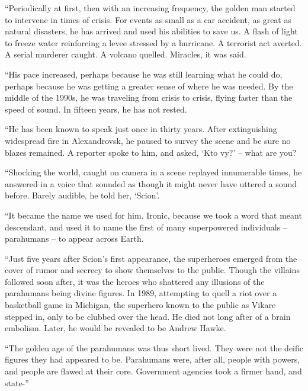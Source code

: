 ``Periodically at first, then with an increasing frequency, the golden man started to intervene in times of crisis.  For events as small as a car accident, as great as natural disasters, he has arrived and used his abilities to save us.  A flash of light to freeze water reinforcing a levee stressed by a hurricane.  A terrorist act averted.  A serial murderer caught.  A volcano quelled.  Miracles, it was said.



``His pace increased, perhaps because he was still learning what he could do, perhaps because he was getting a greater sense of where he was needed.  By the middle of the 1990s, he was traveling from crisis to crisis, flying faster than the speed of sound.  In fifteen years, he has not rested.



``He has been known to speak just once in thirty years.  After extinguishing widespread fire in Alexandrovsk, he paused to survey the scene and be sure no blazes remained.  A reporter spoke to him, and asked, `Kto vy?' – what are you?



``Shocking the world, caught on camera in a scene replayed innumerable times, he answered in a voice that sounded as though it might never have uttered a sound before.  Barely audible, he told her, `Scion'.



``It became the name we used for him.  Ironic, because we took a word that meant descendant, and used it to name the first of many superpowered individuals – parahumans – to appear across Earth.



``Just five years after Scion's first appearance, the superheroes emerged from the cover of rumor and secrecy to show themselves to the public.  Though the villains followed soon after, it was the heroes who shattered any illusions of the parahumans being divine figures.  In 1989, attempting to quell a riot over a basketball game in Michigan, the superhero known to the public as Vikare stepped in, only to be clubbed over the head.  He died not long after of a brain embolism.  Later, he would be revealed to be Andrew Hawke.



``The golden age of the parahumans was thus short lived.  They were not the deific figures they had appeared to be.  Parahumans were, after all, people with powers, and people are flawed at their core.  Government agencies took a firmer hand, and state-''



